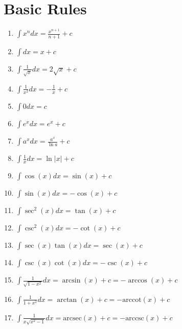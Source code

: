 \section{Basic Rules}
  \begin{enumerate}
    \item $\int x^n dx = \frac{x^{n+1}}{n+1} + c$
    \item $\int dx = x + c$
    \item $\int \frac{1}{\sqrt{x}} dx = 2\sqrt{x} + c$
    \item $\int \frac{1}{x^2} dx = -\frac{1}{x} + c$
    \item $\int 0 dx = c$
    \item $\int e^x dx = e^x + c$
    \item $\int a^x dx = \frac{a^x}{\ln a} + c$
    \item $\int \frac{1}{x} dx = \ln |x| + c$
    \item $\int \cos(x) dx = \sin(x) + c$
    \item $\int \sin(x) dx = -\cos(x) + c$
    \item $\int \sec^2(x) dx = \tan(x) + c$
    \item $\int \csc^2(x) dx = -\cot(x) + c$
    \item $\int \sec(x)\tan(x) dx = \sec(x) + c$
    \item $\int \csc(x)\cot(x) dx = -\csc(x) + c$
    \item $\int \frac{1}{\sqrt{1-x^2}} dx = \arcsin(x) + c = -\arccos(x) + c$
    \item $\int \frac{1}{1+x^2} dx = \arctan(x) + c = -\text{arccot}(x) + c$
    \item $\int \frac{1}{x\sqrt{x^2-1}} dx = \text{arcsec}(x) + c = -\text{arccsc}(x) + c$
  \end{enumerate}
